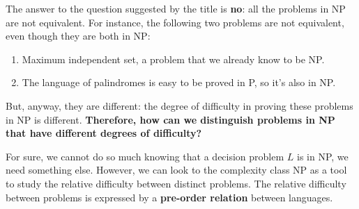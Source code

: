 The answer to the question suggested by the title is \textbf{no}: all the problems in NP are not equivalent. For instance, the following two problems are not
equivalent, even though they are both in NP:
\begin{enumerate}
    \item Maximum independent set, a problem that we already know to be NP.
    \item The language of palindromes is easy to be proved in P, so it's also in NP.
\end{enumerate}
But, anyway, they are different: the degree of difficulty in proving these problems in NP is different. \textbf{Therefore, how can we distinguish problems in NP 
that have different degrees of difficulty?} \vspace{7pt}

For sure, we cannot do so much knowing that a decision problem $L$ is in NP, we need something else. However, we can look to the complexity class NP as a tool 
to study the relative difficulty between distinct problems. The relative difficulty between problems is expressed by a \textbf{pre-order relation} between 
languages.